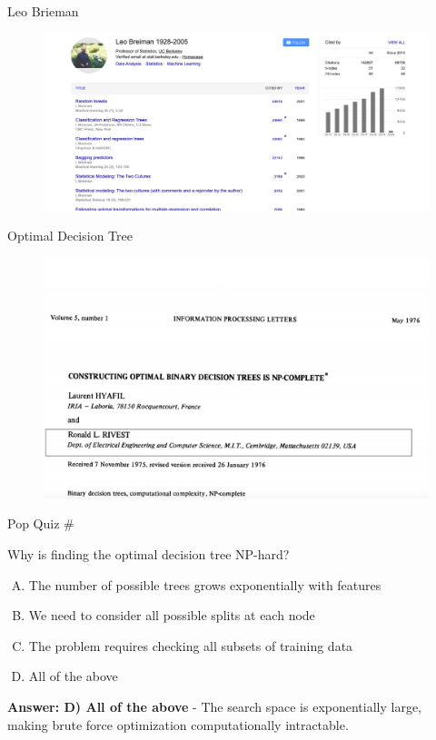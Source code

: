 \documentclass[usenames,dvipsnames]{beamer}
\newcounter{popquiz}
\begin{document}
\begin{frame}{Leo Brieman}
\begin{figure}
	\centering
	\includegraphics[width=1\linewidth]{../assets/decision-trees/diagrams/brieman}

	\label{fig:brieman}
\end{figure}

\end{frame}

\begin{frame}{Optimal Decision Tree}
\begin{figure}
	\centering
	\includegraphics[width=1\linewidth]{../assets/decision-trees/diagrams/NP-hard}

	\label{fig:np-hard}
\end{figure}

\end{frame}

\begin{frame}{Pop Quiz \#\thepopquiz}
\begin{tcolorbox}[colback=blue!5!white,colframe=blue!75!black,title=Quick Question!]
Why is finding the optimal decision tree NP-hard?
\begin{enumerate}[A)]
\item The number of possible trees grows exponentially with features
\item We need to consider all possible splits at each node
\item The problem requires checking all subsets of training data
\item All of the above
\end{enumerate}
\pause
\textbf{Answer: D) All of the above} - The search space is exponentially large, making brute force optimization computationally intractable.
\end{tcolorbox}
\end{frame}
\end{document}
